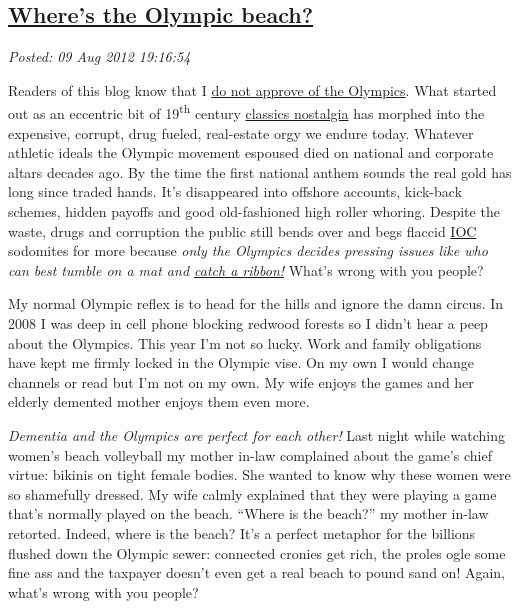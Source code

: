 %

\subsection*{\href{https://bakerjd99.wordpress.com/2012/08/09/wheres-the-olympic-beach/}{Where's the Olympic beach?}}


\noindent\emph{Posted: 09 Aug 2012 19:16:54}
\vspace{6pt}

Readers of this blog know that I
\href{http://bakerjd99.wordpress.com/2009/10/03/my-olympic-spirit/}{do
not approve of the Olympics}. What started out as an eccentric bit of
19\textsuperscript{th} century
\href{http://history1800s.about.com/od/sports/a/Coubertin.htm}{classics
nostalgia} has morphed into the expensive, corrupt, drug fueled,
real-estate orgy we endure today. Whatever athletic ideals the Olympic
movement espoused died on national and corporate altars decades ago. By
the time the first national anthem sounds the real gold has long since
traded hands. It's disappeared into offshore accounts, kick-back
schemes, hidden payoffs and good old-fashioned high roller whoring.
Despite the waste, drugs and corruption the public still bends over and
begs flaccid
\href{http://observer.com/2012/07/those-dirty-rings-corruption-prone-ioc-always-goes-for-the-gold/}{IOC}
sodomites for more because \emph{only the Olympics decides pressing
issues like who can best tumble on a mat and \href{http://www.huffingtonpost.com/elaine-dai/post_3740_b_1746836.html}{catch a ribbon!}} What's wrong
with you people?

My normal Olympic reflex is to head for the hills and ignore the damn
circus. In 2008 I was deep in cell phone blocking redwood forests so I
didn't hear a peep about the Olympics. This year I'm not so lucky. Work
and family obligations have kept me firmly locked in the Olympic vise.
On my own I would change channels or read but I'm not on my own. My wife
enjoys the games and her elderly demented mother enjoys them even more.

\emph{Dementia and the Olympics are perfect for each other!} Last night
while watching women's beach volleyball my mother in-law complained
about the game's chief virtue: bikinis on tight female bodies. She
wanted to know why these women were so shamefully dressed. My wife
calmly explained that they were playing a game that's normally played on
the beach. ``Where is the beach?'' my mother in-law retorted. Indeed,
where is the beach? It's a perfect metaphor for the billions flushed
down the Olympic sewer: connected cronies get rich, the proles ogle some
fine ass and the taxpayer doesn't even get a real beach to pound sand
on! Again, what's wrong with you people?

